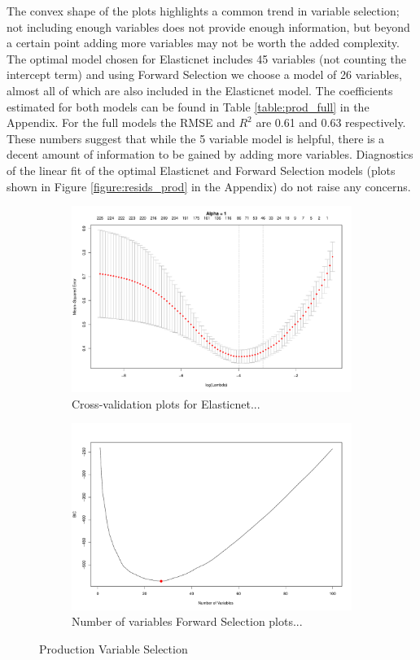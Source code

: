\documentclass{article}
\begin{document}
The convex shape of the plots highlights a common trend in variable selection; not including enough variables does not provide 
enough information, but beyond a certain point adding more variables may not be worth the added complexity. The optimal 
model chosen for Elasticnet includes 45 variables (not counting the intercept term) and using Forward Selection we choose a 
model of 26 variables, almost all of which are also included in the Elasticnet model. The coefficients estimated for both models 
can be found in Table \ref{table:prod_full} in the Appendix. For the full models the RMSE and $R^2$ are 0.61 and 0.63 
respectively. These numbers suggest that while the 5 variable model is helpful, there is a decent amount of information to be 
gained by adding more variables. Diagnostics of the linear fit of the optimal Elasticnet and Forward Selection models (plots shown in Figure \ref{figure:resids_prod} in the Appendix) do not raise any concerns. 

\begin{figure}[!tbp]
\begin{subfigure}[b]{0.5\textwidth}
\includegraphics[width=\textwidth]{elastic_cv_production.pdf}
\caption{Cross-validation plots for Elasticnet...}
\end{subfigure}
\hfill
\begin{subfigure}[b]{0.5\textwidth}
\includegraphics[width=\textwidth]{forward_nvars_production.pdf}
\caption{Number of variables Forward Selection plots...}
\end{subfigure}
\caption{Production Variable Selection}
\label{figure:prod_opt}
\end{figure}
\end{document}
